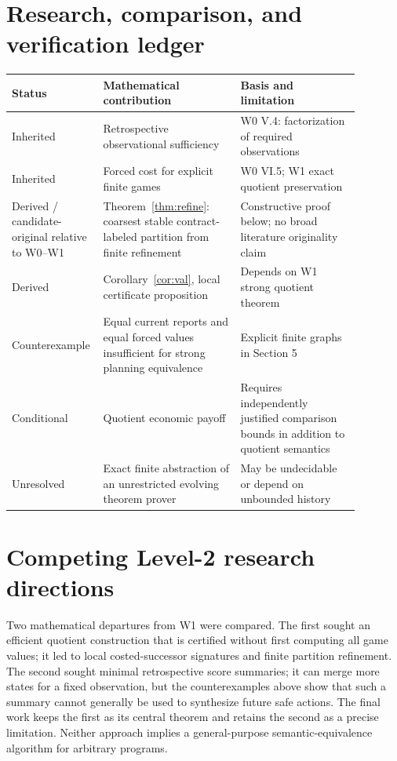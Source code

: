 \documentclass[11pt,letterpaper]{article}
\theoremstyle{definition}
\theoremstyle{remark}
\begin{document}
\section{Research, comparison, and verification ledger}
\small
\begin{longtable}{p{0.17\linewidth}p{0.38\linewidth}p{0.33\linewidth}}
\toprule Status & Mathematical contribution & Basis and limitation \\\midrule\endhead
Inherited & Retrospective observational sufficiency & W0 V.4: factorization of required observations \\
Inherited & Forced cost for explicit finite games & W0 VI.5; W1 exact quotient preservation \\
Derived / candidate-original relative to W0--W1 & Theorem~\ref{thm:refine}: coarsest stable contract-labeled partition from finite refinement & Constructive proof below; no broad literature originality claim \\
Derived & Corollary~\ref{cor:val}, local certificate proposition & Depends on W1 strong quotient theorem \\
Counterexample & Equal current reports and equal forced values insufficient for strong planning equivalence & Explicit finite graphs in Section 5 \\
Conditional & Quotient economic payoff & Requires independently justified comparison bounds in addition to quotient semantics \\
Unresolved & Exact finite abstraction of an unrestricted evolving theorem prover & May be undecidable or depend on unbounded history \\
\bottomrule
\end{longtable}
\normalsize


\section{Competing Level-2 research directions}
Two mathematical departures from W1 were compared. The first sought an efficient quotient construction that is certified without first computing all game values; it led to local costed-successor signatures and finite partition refinement. The second sought minimal retrospective score summaries; it can merge more states for a fixed observation, but the counterexamples above show that such a summary cannot generally be used to synthesize future safe actions. The final work keeps the first as its central theorem and retains the second as a precise limitation. Neither approach implies a general-purpose semantic-equivalence algorithm for arbitrary programs.
\end{document}
